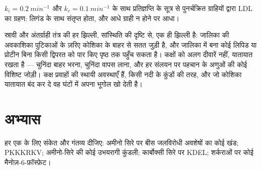 \begin{omfigure}

{\small $k_{i} = \qty{0.2}{min^{-1}}$ और $k_{r} =
\qty{0.1}{min^{-1}}$ के साथ प्रतिज्ञप्ति के सूत्र से पुनर्चक्रित
ग्राहियों द्वारा LDL का ग्रहण: लिगंड के साथ संतृप्त होता, और आधे ग्राही
न होने पर आधा।}
\end{omfigure}

\begin{remark}[एक झिल्ली, अनेक कक्ष]\label{rem:b3:membrane-traffic:one-membrane}
स्रावी और अंतर्ग्राही तंत्र की हर झिल्ली, सांस्थिति की दृष्टि से,
एक ही झिल्ली है: जालिका की अवकाशिका पुटिकाओं के ज़रिए कोशिका के बाहर से
सतत जुड़ी है, और जालिका में बना कोई लिपिड या प्रोटीन बिना किसी द्विपरत
को पार किए पृष्ठ तक पहुँच सकता है। कक्षों को अलग दीवारें नहीं, यातायात
रखता है --- चुनिंदा बाहर भरना, चुनिंदा वापस लाना, और हर संलयन पर पहचान
के अणुओं की कोई विशिष्ट जोड़ी। कक्ष प्रवाहों की स्थायी अवस्थाएँ हैं,
किसी नदी के कुंडों की तरह, और जो कोशिका यातायात बंद कर दे वह घंटों में
अपना भूगोल खो देती है।
\end{remark}

\section{अभ्यास}

\begin{exercise}[$\star$]\label{exo:b3:membrane-traffic:1}
हर एक के लिए संकेत और गंतव्य दीजिए: अमीनो सिरे पर बीस जलविरोधी अवशेषों
का कोई खंड; PKKKRKV; अमीनो-सिरे की कोई उभयरागी कुंडली; कार्बोक्सी सिरे
पर KDEL; शर्कराओं पर कोई
मैनोज़-6-फ़ॉस्फ़ेट।
\end{exercise}

